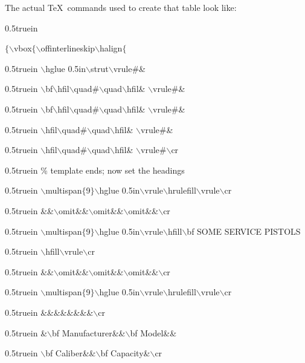 The actual \TeX\ commands used to create that table look like:
\bigskip\par\noindent\hglue 0.5truein
{\twltt 
$\{$$\backslash$vbox$\{${}$\backslash$offinterlineskip$\backslash$halign$\{$
\par\noindent\hglue 0.5truein
$\backslash$hglue 0.5in$\backslash$strut$\backslash$vrule\#\&
\par\noindent\hglue 0.5truein
$\backslash$bf$\backslash$hfil$\backslash$quad\#$\backslash$quad$\backslash$hfil\&%
$\backslash$vrule\#\&
\par\noindent\hglue 0.5truein
$\backslash$bf$\backslash$hfil$\backslash$quad\#$\backslash$quad$\backslash$hfil\&%
$\backslash$vrule\#\&
\par\noindent\hglue 0.5truein
$\backslash$hfil$\backslash$quad\#$\backslash$quad$\backslash$hfil\&%
$\backslash$vrule\#\&
\par\noindent\hglue 0.5truein
$\backslash$hfil$\backslash$quad\#$\backslash$quad$\backslash$hfil\&%
$\backslash$vrule\#$\backslash$cr
\par\noindent\hglue 0.5truein
\% template ends; now set the headings
\par\noindent\hglue 0.5truein
$\backslash$multispan$\{$9$\}${}$\backslash$hglue 0.5in$\backslash$vrule$\backslash$hrulefill$\backslash$vrule$\backslash$cr
\par\noindent\hglue 0.5truein
\&\&$\backslash$omit\&\&$\backslash$omit\&\&$\backslash$omit\&\&$\backslash$cr
\par\noindent\hglue 0.5truein
$\backslash$multispan$\{$9$\}${}$\backslash$hglue 0.5in$\backslash$vrule$\backslash$hfill$\backslash$bf SOME SERVICE PISTOLS
\par\noindent\hglue 0.5truein
$\backslash$hfill$\backslash$vrule$\backslash$cr
\par\noindent\hglue 0.5truein
\&\&$\backslash$omit\&\&$\backslash$omit\&\&$\backslash$omit\&\&$\backslash$cr
\par\noindent\hglue 0.5truein
$\backslash$multispan$\{$9$\}${}$\backslash$hglue 0.5in$\backslash$vrule$\backslash$hrulefill$\backslash$vrule$\backslash$cr
\par\noindent\hglue 0.5truein
\&\&\&\&\&\&\&\&$\backslash$cr
\par\noindent\hglue 0.5truein
\&$\backslash$bf Manufacturer\&\&$\backslash$bf Model\&\&
\par\noindent\hglue 0.5truein
$\backslash$bf Caliber\&\&$\backslash$bf Capacity\&$\backslash$cr
$$}
